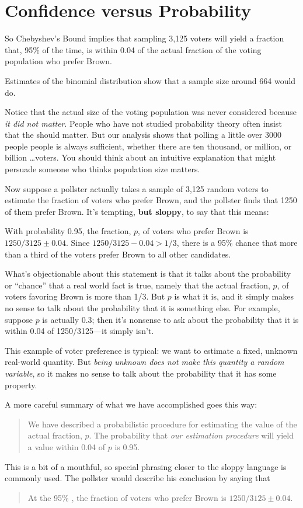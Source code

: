 \section{Confidence versus Probability}

So Chebyshev's Bound implies that sampling 3,125 voters will yield a
fraction that, 95\% of the time, is within 0.04 of the actual fraction
of the voting population who prefer Brown.
\begin{editingnotes}
  Estimates of the binomial distribution show that a sample size
  around 664 would do.
\end{editingnotes}

Notice that the actual size of the voting population was never
considered because \emph{it did not matter}.  People who have not
studied probability theory often insist that the 
should matter.  But our analysis shows that polling a little over 3000
people people is always sufficient, whether there are ten thousand, or
million, or billion \dots voters.  You should think about an intuitive
explanation that might persuade someone who thinks population size
matters.

Now suppose a pollster actually takes a sample of 3,125 random voters to
estimate the fraction of voters who prefer Brown, and the pollster finds
that 1250 of them prefer Brown.  It's tempting, \textbf{but sloppy}, to
say that this means:
\begin{falseclm*}
  With probability 0.95, the fraction, $p$, of voters who prefer Brown
  is $1250/3125 \pm 0.04$.  Since $1250/3125 -0.04 > 1/3$, there is a 95\%
  chance that more than a third of the voters prefer Brown to all other
  candidates.
\end{falseclm*}
What's objectionable about this statement is that it talks about the
probability or ``chance'' that a real world fact is true, namely that the
actual fraction, $p$, of voters favoring Brown is more than 1/3.  But $p$
is what it is, and it simply makes no sense to talk about the probability
that it is something else.  For example, suppose $p$ is actually 0.3;
then it's nonsense to ask about the probability that it is within 0.04 of
1250/3125---it simply isn't.

This example of voter preference is typical: we want to estimate a fixed,
unknown real-world quantity.  But \emph{being unknown does not make this
  quantity a random variable}, so it makes no sense to talk about the
probability that it has some property.

A more careful summary of what we have accomplished goes this way:
\begin{quote}
We have described a probabilistic procedure for estimating the value of
the actual fraction, $p$.  The probability that \emph{our estimation
procedure} will yield a value within 0.04 of $p$ is 0.95.
\end{quote}
This is a bit of a mouthful, so special phrasing closer to the sloppy
language is commonly used.  The pollster would describe his conclusion by
saying that
\begin{quote}
At the 95\% , the fraction of voters
who prefer Brown is $1250/3125 \pm 0.04$.
\end{quote}

